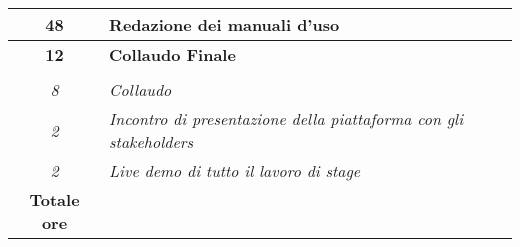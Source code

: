 \begin{tabularx}{\textwidth}{|c|X|}
	\textbf{48} & \textbf{Redazione dei manuali d'uso}  \\
    \hline    
    
    \textbf{12} & \textbf{Collaudo Finale}  \\ \hdashline 
    \multirow{4}{0cm}\\ 
    \textit{8} & 
    \textit{Collaudo} \\
    \textit{2} & 
    \textit{Incontro di presentazione della piattaforma con gli stakeholders} \\
    \textit{2} & 
    \textit{Live demo di tutto il lavoro di stage} \\
    \hline
	
	\textbf{Totale ore} & \multicolumn{1}{|c|}{\textbf{\totaleOre}} \\\hline
	
	
\end{tabularx}